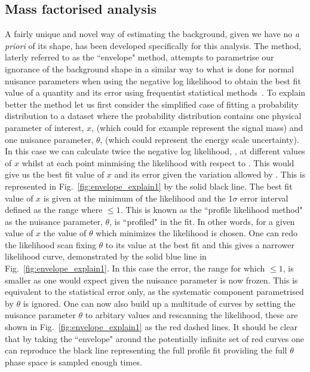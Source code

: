\subsection{Mass factorised analysis}
\label{sec:envelope}

A fairly unique and novel way of estimating the background, given we have no \emph{a priori} of its shape, has been developed specifically for this analysis. The method, laterly referred to as the ``envelope" method, attempts to parametrise our ignorance of the background shape in a similar way to what is done for normal nuisance parameters when using the negative log likelihood to obtain the best fit value of a quantity and its error using frequentist statistical methods~\cite{FredJames}. To explain better the method let us first consider the simplified case of fitting a probability distribution to a dataset where the probability distribution contains one physical parameter of interest, $x$, (which could for example represent the signal mass) and one nuisance parameter, $\theta$, (which could represent the energy scale uncertainty). In this case we can calculate twice the negative log likelihood, \NLL, at different values of $x$ whilst at each point minmising the likelihood with respect to \theta. 
This would give us the best fit value of $x$ and its error given the variation allowed by \theta. This is represented in Fig.~\ref{fig:envelope_explain1} by the solid black line. The best fit value of $x$ is given at the minimum of the likelihood and the 1$\sigma$ error interval defined as the range where \NLL$\leq1$. This is known as the ``profile likelihood method" as the nuisance parameter, $\theta$, is ``profiled" in the fit. In other words, for a given value of $x$ the value of $\theta$ which minimizes the likelihood is chosen. One can redo the likelihood scan fixing $\theta$ to its value at the best fit and this gives a narrower likelihood curve, demonstrated by the solid blue line in Fig.~\ref{fig:envelope_explain1}. In this case the error, the range for which \NLL$\leq1$, is smaller as one would expect given the nuisance parameter is now frozen. This is equivalent to the statistical error only, as the systematic component parametrised by $\theta$ is ignored. One can now also build up a multitude of curves by setting the nuisance parameter $\theta$ to arbitary values and rescanning the likelihood, these are shown in Fig.~\ref{fig:envelope_explain1} as the red dashed lines. It should be clear that by taking the ``envelope" around the potentially infinite set of red curves one can reproduce the black line representing the full profile fit providing the full $\theta$ phase space is sampled enough times. 
